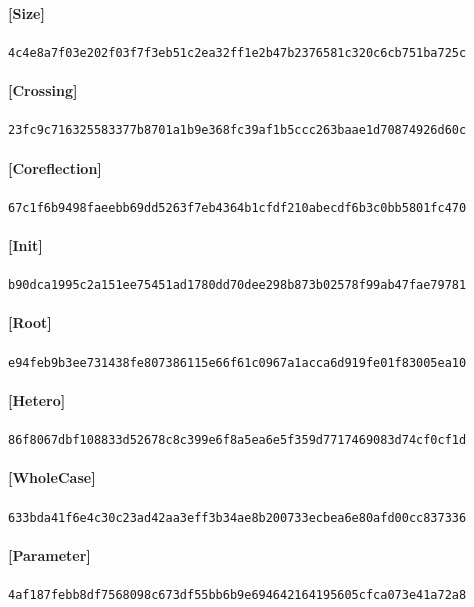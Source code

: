 \documentclass[11pt]{article}
\begin{document}
\paragraph{[Size]} \par
{\small\texttt{4c4e8a7f03e202f03f7f3eb51c2ea32ff1e2b47b2376581c320c6cb751ba725c}}
\paragraph{[Crossing]} \par
{\small\texttt{23fc9c716325583377b8701a1b9e368fc39af1b5ccc263baae1d70874926d60c}}
\paragraph{[Coreflection]} \par
{\small\texttt{67c1f6b9498faeebb69dd5263f7eb4364b1cfdf210abecdf6b3c0bb5801fc470}}
\paragraph{[Init]} \par
{\small\texttt{b90dca1995c2a151ee75451ad1780dd70dee298b873b02578f99ab47fae79781}}
\paragraph{[Root]} \par
{\small\texttt{e94feb9b3ee731438fe807386115e66f61c0967a1acca6d919fe01f83005ea10}}
\paragraph{[Hetero]} \par
{\small\texttt{86f8067dbf108833d52678c8c399e6f8a5ea6e5f359d7717469083d74cf0cf1d}}
\paragraph{[WholeCase]} \par
{\small\texttt{633bda41f6e4c30c23ad42aa3eff3b34ae8b200733ecbea6e80afd00cc837336}}
\paragraph{[Parameter]} \par
{\small\texttt{4af187febb8df7568098c673df55bb6b9e694642164195605cfca073e41a72a8}}
\end{document}
